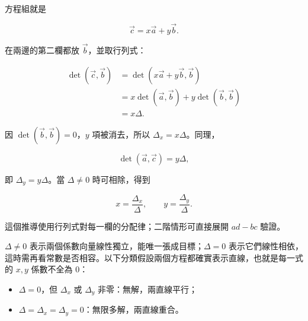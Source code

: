 \documentclass[11pt,a4paper]{article}
\providecommand{\tightlist}{%
  \setlength{\itemsep}{0pt}\setlength{\parskip}{0pt}}
\begin{document}
方程組就是

\[
\vec c=x\vec a+y\vec b.
\]

在兩邊的第二欄都放 \(\vec b\)，並取行列式：

\[
\begin{aligned}
\det(\vec c,\vec b)
&=\det(x\vec a+y\vec b,\vec b)\\
&=x\det(\vec a,\vec b)+y\det(\vec b,\vec b)\\
&=x\Delta.
\end{aligned}
\]

因 \(\det(\vec b,\vec b)=0\)，\(y\) 項被消去，所以 \(\Delta_x=x\Delta\)。同理，

\[
\det(\vec a,\vec c)=y\Delta,
\]

即 \(\Delta_y=y\Delta\)。當 \(\Delta\ne0\) 時可相除，得到

\[
x=\frac{\Delta_x}{\Delta},
\qquad
y=\frac{\Delta_y}{\Delta}.
\]

這個推導使用行列式對每一欄的分配律；二階情形可直接展開 \(ad-bc\) 驗證。

\(\Delta\ne0\) 表示兩個係數向量線性獨立，能唯一張成目標；\(\Delta=0\) 表示它們線性相依，這時需再看常數是否相容。以下分類假設兩個方程都確實表示直線，也就是每一式的 \(x,y\) 係數不全為 \(0\)：

\begin{itemize}
\tightlist
\item
  \(\Delta=0\)，但 \(\Delta_x\) 或 \(\Delta_y\) 非零：無解，兩直線平行；
\item
  \(\Delta=\Delta_x=\Delta_y=0\)：無限多解，兩直線重合。
\end{itemize}
\end{document}
